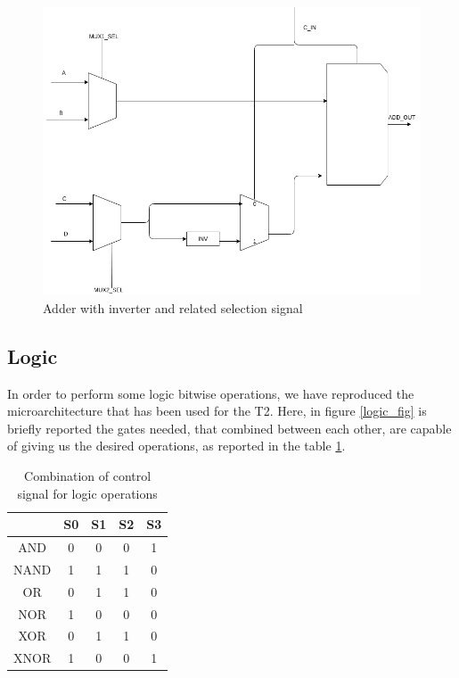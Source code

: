 \begin{figure}
	\includegraphics[width=\textwidth]{chapters/figures/adder}
	\caption{Adder with inverter and related selection signal}
	\label{adder_fig}
\end{figure}


\subsection{Logic}

In order to perform some logic bitwise operations, we have reproduced the microarchitecture that has been used for the \textsf{T2}. Here, in figure \ref{logic_fig} is briefly reported the gates needed, that combined between each other, are capable of giving us the desired operations, as reported in the table \ref{logicT2_table}.

\begin{table}[ht]
	\centering
	\begin{tabular}{c|cccc}
		\toprule
				& S0 	& S1	& S2	& S3 \\
		\midrule
		AND		& 0		& 0		& 0		& 1	 \\
		NAND	& 1		& 1		& 1		& 0	 \\
		OR		& 0		& 1		& 1		& 0	 \\
		NOR		& 1		& 0		& 0		& 0	 \\
		XOR		& 0		& 1		& 1		& 0	 \\
		XNOR	& 1		& 0		& 0		& 1	 \\
		\bottomrule
	\end{tabular}
	\caption{Combination of control signal for logic operations}
	\label{logicT2_table} %
\end{table}

